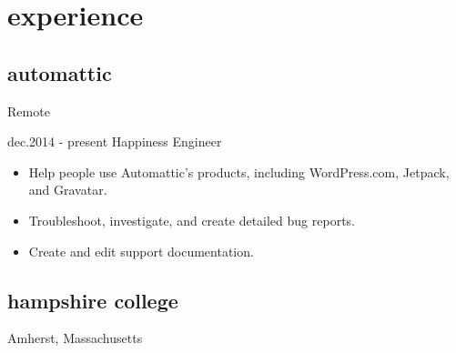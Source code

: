 \documentclass[]{friggeri-cv} %
\begin{document}
\begin{multicols}{3}
\fontsize{9pt}{11pt}

\end{multicols}

\small\bodyfont{\ }

\vspace{-3\parskip}
\section{experience}
\subsection
{automattic}
{Remote}

\begin{entrylist}
\entry
{dec.2014 - present}
{Happiness Engineer}{}
{\begin{itemize}[leftmargin=*,topsep=0pt]
\item Help people use Automattic’s products, including WordPress.com, Jetpack, and Gravatar.
\item Troubleshoot, investigate, and create detailed bug reports.
\item Create and edit support documentation.
\end{itemize}}
\end{entrylist}
\subsection
{hampshire college}
{Amherst, Massachusetts}
\end{document}
